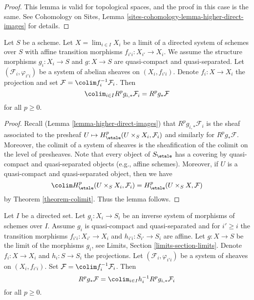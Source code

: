 \begin{proof}
This lemma is valid for topological spaces, and the proof in this case is the
same. See
Cohomology on Sites, Lemma
\ref{sites-cohomology-lemma-higher-direct-images}
for details.
\end{proof}

\begin{lemma}
\label{lemma-relative-colimit}
Let $S$ be a scheme. Let $X = \lim_{i \in I} X_i$ be a limit of a
directed system of schemes over $S$ with affine transition morphisms
$f_{i'i} : X_{i'} \to X_i$. We assume the structure morphisms
$g_i : X_i \to S$ and $g : X \to S$ are quasi-compact and quasi-separated.
Let $(\mathcal{F}_i, \varphi_{i'i})$ be a system of abelian sheaves
on $(X_i, f_{i'i})$. Denote $f_i : X \to X_i$ the projection and set
$\mathcal{F} = \colim f_i^{-1}\mathcal{F}_i$. Then
$$
\colim_{i\in I} R^p g_{i, *} \mathcal{F}_i = R^p g_* \mathcal{F}
$$
for all $p \geq 0$.
\end{lemma}

\begin{proof}
Recall (Lemma \ref{lemma-higher-direct-images})
that $R^p g_{i, *} \mathcal{F}_i$ is the sheaf associated to the
presheaf $U \mapsto H^p_\etale(U \times_S X_i, \mathcal{F}_i)$
and similarly for $R^pg_*\mathcal{F}$. Moreover, the colimit of a
system of sheaves is the sheafification of the colimit on the level
of presheaves. Note that every object of $S_\etale$ has a covering
by quasi-compact and quasi-separated objects (e.g., affine schemes).
Moreover, if $U$ is a quasi-compact and quasi-separated object,
then we have
$$
\colim H^p_\etale(U \times_S X_i, \mathcal{F}_i) =
H^p_\etale(U \times_S X, \mathcal{F})
$$
by Theorem \ref{theorem-colimit}. Thus the lemma follows.
\end{proof}

\begin{lemma}
\label{lemma-relative-colimit-general}
Let $I$ be a directed set. Let $g_i : X_i \to S_i$ be an inverse system of
morphisms of schemes over $I$. Assume $g_i$ is quasi-compact and
quasi-separated and for $i' \geq i$ the transition morphisms
$f_{i'i} : X_{i'} \to X_i$ and $h_{i'i} : S_{i'} \to S_i$ are affine.
Let $g : X \to S$ be the limit of the morphisms $g_i$, see
Limits, Section \ref{limits-section-limits}.
Denote $f_i : X \to X_i$ and $h_i : S \to S_i$ the projections.
Let $(\mathcal{F}_i, \varphi_{i'i})$ be a system of sheaves
on $(X_i, f_{i'i})$. Set $\mathcal{F} = \colim f_i^{-1}\mathcal{F}_i$. Then
$$
R^p g_* \mathcal{F} =
\colim_{i \in I} h_i^{-1}R^p g_{i, *} \mathcal{F}_i
$$
for all $p \geq 0$.
\end{lemma}

